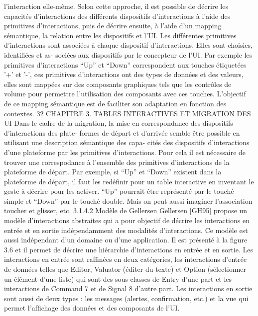 \documentclass{article}
\begin{document}
l’interaction elle-même. Selon cette approche, il est possible de décrire les capacités d’interactions
des différents dispositifs d’interactions à l’aide des primitives d’interactions, puis de décrire ensuite,
à l’aide d’un mapping sémantique, la relation entre les dispositifs et l’UI. Les différentes primitives
d’interactions sont associées à chaque dispositif d’interactions. Elles sont choisies, identiﬁées et as-
sociées aux dispositifs par le concepteur de l’UI. Par exemple les primitives d’interactions “Up” et
“Down” correspondent aux touches étiquetées ’+’ et ’-’, ces primitives d’interactions ont des types
de données et des valeurs, elles sont mappées sur des composants graphiques tels que les contrôles
de volume pour permettre l’utilisation des composants avec ces touches. L’objectif de ce mapping
sémantique est de faciliter son adaptation en fonction des contextes.
32
CHAPITRE 3. TABLES INTERACTIVES ET MIGRATION DES UI
Dans le cadre de la migration, la mise en correspondance des dispositifs d’interactions des plate-
formes de départ et d’arrivée semble être possible en utilisant une description sémantique des capa-
cités des dispositifs d’interactions d’une plateforme par les primitives d’interactions. Pour cela il est
nécessaire de trouver une correspodance à l’ensemble des primitives d’interactions de la plateforme de
départ. Par exemple, si “Up” et “Down” existent dans la plateforme de départ, il faut les redéﬁnir pour
un table interactive en inventant le geste à décrire pour les activer. “Up” pourrait être représenté par le
touché simple et “Down” par le touché double. Mais on peut aussi imaginer l’association toucher et
glisser, etc.
3.1.4.2
Modèle de Gellersen
Gellersen [GH95] propose un modèle d’interactions abstraites qui a pour objectif de décrire les
interactions en entrée et en sortie indépendamment des modalités d’interactions. Ce modèle est aussi
indépendant d’un domaine ou d’une application. Il est présenté à la ﬁgure 3.6 et il permet de décrire
une hiérarchie d’interactions en entrée et en sortie. Les interactions en entrée sont rafﬁnées en deux
catégories, les interactions d’entrée de données telles que Editor, Valuator (éditer du texte) et Option
(sélectionner un élément d’une liste) qui sont des sous-classes de Entry d’une part et les interactions
de Command 7 et de Signal 8 d’autre part. Les interactions en sortie sont aussi de deux types : les
messages (alertes, conﬁrmation, etc.) et la vue qui permet l’afﬁchage des données et des composants
de l’UI.
 
\end{document}
